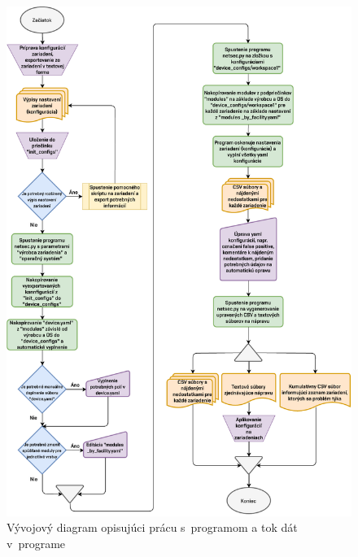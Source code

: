 \begin{figure}[H]
	\begin{center}
		\vspace*{-1cm}\includegraphics[scale=0.8]{obrazky/flowchart.pdf}
	\end{center}
	\caption[Vývojový diagram opisujúci prácu s~programom a tok dát v~programe]{Vývojový diagram opisujúci prácu s~programom a tok dát v~programe}
	\label{workflow}
\end{figure}

 


